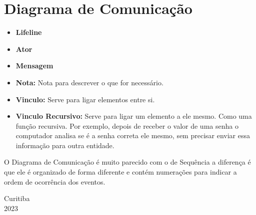 \documentclass[12pt, a4paper]{article}
\begin{document}
\indent
\section{Diagrama de Comunicação}

{\Large
\begin{itemize}
    \item \textbf{Lifeline}
    \item \textbf{Ator}
    \item \textbf{Mensagem}
    \item \textbf{Nota:} Nota para descrever o que for necessário.
    \item \textbf{Vinculo:} Serve para ligar elementos entre si.
    \item \textbf{Vinculo Recursivo:} Serve para ligar um elemento a ele mesmo.
    Como uma função recursiva. Por exemplo, depois de receber o valor de uma senha
    o computador analisa se é a senha correta ele mesmo, sem precisar enviar essa informação
    para outra entidade.
\end{itemize}

\hspace{1em}O Diagrama de Comunicação é muito parecido com o de Sequência
a diferença é que ele é organizado de forma diferente e contém numerações
para indicar a ordem de ocorrência dos eventos.


\vfill
\begin{center}
    Curitiba\\
    2023
\end{center}
}
\end{document}
